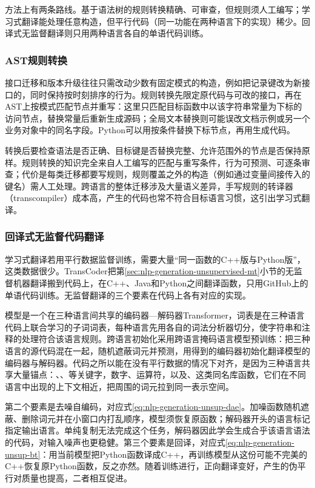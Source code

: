 方法上有两条路线。基于语法树的规则转换精确、可审查，但规则须人工编写；学习式翻译能处理任意构造，但平行代码（同一功能在两种语言下的实现）稀少。回译式无监督翻译则只用两种语言各自的单语代码训练。

\subsubsection{AST规则转换}
\label{sec:nlp-execution-ast-rewrite}

接口迁移和版本升级往往只需改动少数有固定模式的构造，例如把记录键改为新接口的，同时保持按时刻排序的行为。规则转换先限定原代码与可改的接口，再在AST上按模式匹配节点并重写：这里只匹配目标函数中以该字符串常量为下标的访问节点，替换常量后重新生成源码；全局文本替换则可能误改文档示例或另一个业务对象中的同名字段。Python可以用按条件替换下标节点，再用生成代码。

转换后要检查语法是否正确、目标键是否替换完整、允许范围外的节点是否保持原样。规则转换的知识完全来自人工编写的匹配与重写条件，行为可预测、可逐条审查；代价是每类迁移都要写规则，规则覆盖之外的构造（例如通过变量间接传入的键名）需人工处理。跨语言的整体迁移涉及大量语义差异，手写规则的转译器（transcompiler）成本高，产生的代码也常不符合目标语言习惯，这引出学习式翻译。

\subsubsection{回译式无监督代码翻译}
\label{sec:nlp-execution-transcoder}

学习式翻译若用平行数据监督训练，需要大量“同一函数的C++版与Python版”，这类数据很少。TransCoder把第\ref{sec:nlp-generation-unsupervised-mt}小节的无监督机器翻译搬到代码上，在C++、Java和Python之间翻译函数，只用GitHub上的单语代码训练。无监督翻译的三个要素在代码上各有对应的实现。

模型是一个在三种语言间共享的编码器—解码器Transformer，词表是在三种语言代码上联合学习的子词词表，每种语言先用各自的词法分析器切分，使字符串和注释的处理符合该语言规则。跨语言初始化采用跨语言掩码语言模型预训练：把三种语言的源代码混在一起，随机遮蔽词元并预测，用得到的编码器初始化翻译模型的编码器与解码器。代码之所以能在没有平行数据的情况下对齐，是因为三种语言共享大量锚点：、、等关键字，数字、运算符，以及、这类同名库函数，它们在不同语言中出现的上下文相近，把周围的词元拉到同一表示空间。

第二个要素是去噪自编码，对应式\eqref{eq:nlp-generation-unsup-dae}。加噪函数随机遮蔽、删除词元并在小窗口内打乱顺序，模型须恢复原函数；解码器开头的语言标记指定输出语言。单纯复制无法完成这个任务，解码器因此学会生成合乎该语言语法的代码，对输入噪声也更稳健。第三个要素是回译，对应式\eqref{eq:nlp-generation-unsup-bt}：用当前模型把Python函数译成C++，再训练模型从这份可能不完美的C++恢复原Python函数，反之亦然。随着训练进行，正向翻译变好，产生的伪平行对质量也提高，二者相互促进。

